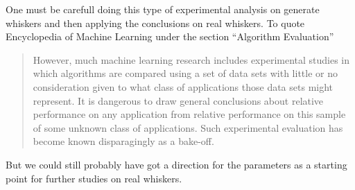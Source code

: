 
One must be carefull doing this type of experimental analysis on generate whiskers and then
applying the conclusions on real whiskers. To quote Encyclopedia of Machine Learning\cite{EncyclopediaMachineLearning} under the section ``Algorithm Evaluation''
\begin{quote}
    However, much machine learning
    research includes experimental studies in which algorithms 
    are compared using a set of data sets with little
    or no consideration given to what class of applications
    those data sets might represent. It is dangerous to draw
    general conclusions about relative performance on any
    application from relative performance on this sample
    of some unknown class of applications. Such experimental
    evaluation has become known disparagingly as a bake-off.
\end{quote}

But we could still probably have got a direction for the parameters
as a starting point for further studies on real whiskers.



